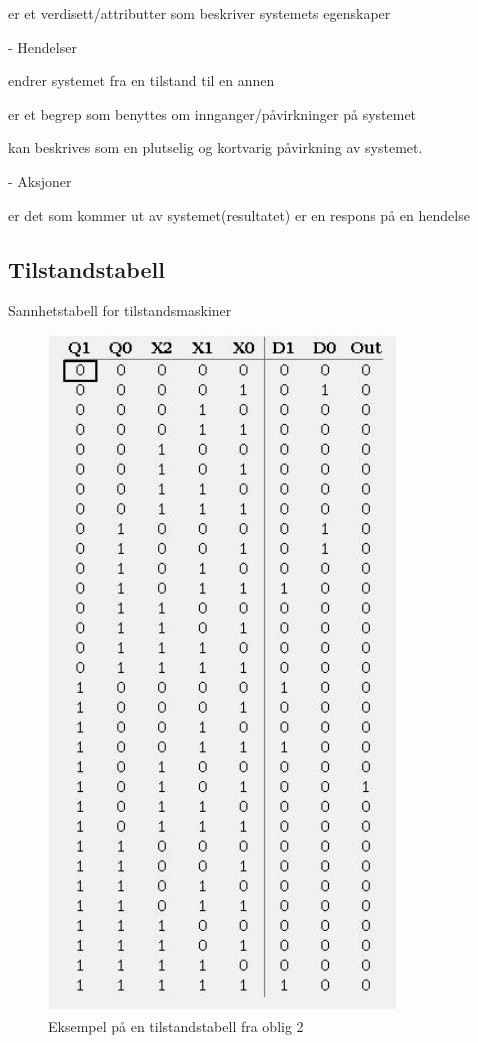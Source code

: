 \documentclass{article}
\begin{document}
	er et verdisett/attributter som beskriver systemets egenskaper
	
	- Hendelser
	
	endrer systemet fra en tilstand til en annen
	
	er et begrep som benyttes om innganger/påvirkninger på 
	systemet 

	kan beskrives som en plutselig og kortvarig påvirkning av 
	systemet. 
	
	- Aksjoner
	
	er det som kommer ut av systemet(resultatet)
	er en respons på en hendelse 

	
	\subsection{Tilstandstabell}
	Sannhetstabell for tilstandsmaskiner
	
	
	\begin{figure}[H]
		\includegraphics[scale = 0.6]{ekstil.jpg}
		\caption{Eksempel på en tilstandstabell fra oblig 2}
	\end{figure}
	
\end{document}

